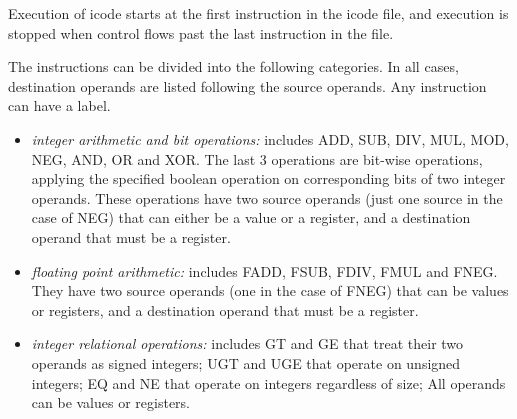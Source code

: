 \documentclass{article}
\begin{document}
Execution of icode starts at the first instruction in the icode file, and
execution is stopped when control flows past the last instruction in the file.

The instructions can be divided into the following categories. In all cases,
destination operands are listed following the source operands. Any instruction
can have a label.
%
\begin{itemize}
\item {\em integer arithmetic and bit operations:} includes ADD, SUB, DIV,
  MUL, MOD, NEG, AND, OR and XOR. The last 3 operations are bit-wise
  operations, applying the specified boolean operation on corresponding
  bits of two integer operands. These operations have two source operands
  (just one source in the case of NEG) that can either be a value or a
  register, and a destination operand that must be a register.
%
\item {\em floating point arithmetic:}
      includes FADD, FSUB, FDIV, FMUL and FNEG. They have two source operands
      (one in the case of FNEG) that can be values or registers, and a 
      destination operand that must be a register.
%
\item {\em integer relational operations:} includes GT and GE that treat their
      two operands as signed integers; UGT and UGE that operate on unsigned 
      integers; EQ and NE that operate on integers regardless of size; 
      All operands can be values or registers.


\end{itemize}
\end{document}
